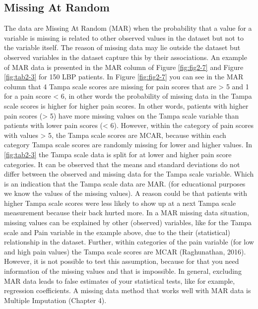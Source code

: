 \documentclass[]{book}
\theoremstyle{definition}
\theoremstyle{definition}
\theoremstyle{definition}
\theoremstyle{remark}
\begin{document}
\subsection{Missing At Random}\label{missing-at-random}

The data are Missing At Random (MAR) when the probability that a value
for a variable is missing is related to other observed values in the
dataset but not to the variable itself. The reason of missing data may
lie outside the dataset but observed variables in the dataset capture
this by their associations. An example of MAR data is presented in the
MAR column of Figure \ref{fig:fig2-7} and Figure \ref{fig:tab2-3} for
150 LBP patients. In Figure \ref{fig:fig2-7} you can see in the MAR
column that 4 Tampa scale scores are missing for pain scores that are
\textgreater{} 5 and 1 for a pain score \textless{} 6, in other words
the probability of missing data in the Tampa scale scores is higher for
higher pain scores. In other words, patients with higher pain scores
(\textgreater{} 5) have more missing values on the Tampa scale variable
than patients with lower pain scores (\textless{} 6). However, within
the category of pain scores with values \textgreater{} 5, the Tampa
scale scores are MCAR, because within each category Tampa scale scores
are randomly missing for lower and higher values. In \ref{fig:tab2-3}
the Tampa scale data is split for at lower and higher pain score
categories. It can be observed that the means and standard deviations do
not differ between the observed and missing data for the Tampa scale
variable. Which is an indication that the Tampa scale data are MAR. (for
educational purposes we know the values of the missing values). A reason
could be that patients with higher Tampa scale scores were less likely
to show up at a next Tampa scale measurement because their back hurted
more. In a MAR missing data situation, missing values can be explained
by other (observed) variables, like for the Tampa scale and Pain
variable in the example above, due to the their (statistical)
relationship in the dataset. Further, within categories of the pain
variable (for low and high pain values) the Tampa scale scores are MCAR
(Raghunathan, 2016). However, it is not possible to test this
assumption, because for that you need information of the missing values
and that is impossible. In general, excluding MAR data leads to false
estimates of your statistical tests, like for example, regression
coefficients. A missing data method that works well with MAR data is
Multiple Imputation (Chapter 4).
\end{document}
